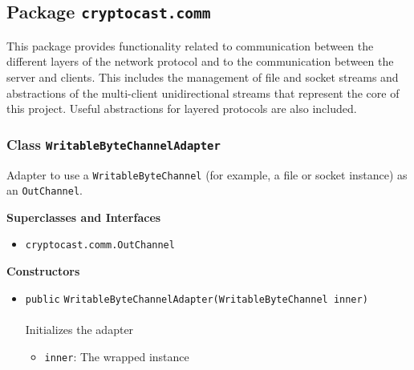 \subsection{Package \lstinline!cryptocast.comm!}
This package provides functionality related to communication between the different layers
 of the network protocol and to the communication between the server and clients. This includes
 the management of file and socket streams and abstractions of the multi-client unidirectional
 streams that represent the core of this project.
 Useful abstractions for layered protocols are also included.

\subsubsection{Class \lstinline|WritableByteChannelAdapter|}
Adapter to use a \lstinline|WritableByteChannel| (for example, a file or socket instance) as
 an \lstinline|OutChannel|. \\
\noindent\begin{minipage}[t]{5cm}
\vspace{0.3em}
\hspace*{2em}
\vspace{0.3em}
\end{minipage}



\textbf{\sffamily Superclasses and Interfaces}
\begin{itemize}
\item \lstinline|cryptocast.comm.OutChannel|
\end{itemize}


\textbf{\sffamily Constructors}
\begin{itemize}
\item \lstinline|public| \lstinline|WritableByteChannelAdapter|\lstinline|(WritableByteChannel inner)|\\ \\[-0.6em]
Initializes the adapter
\begin{itemize}
\item \lstinline|inner|: The wrapped instance
\end{itemize}



\end{itemize}


